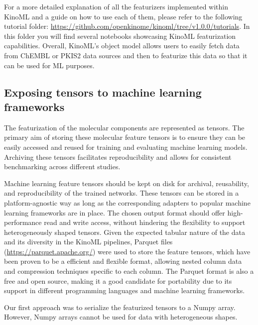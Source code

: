 \documentclass[9pt,lessons, pubversion]{livecoms}
\begin{document}
For a more detailed explanation of all the featurizers implemented within KinoML and a guide on how to use each of them, please refer to the following tutorial folder: \url{https://github.com/openkinome/kinoml/tree/v1.0.0/tutorials}. In this folder you will find several notebooks showcasing KinoML featurization capabilities. Overall, KinoML's object model allows users to easily fetch data from ChEMBL or PKIS2 data sources and then to featurize this data so that it can be used for ML purposes.


\subsection{Exposing tensors to machine learning frameworks}

The featurization of the molecular components are represented as tensors. The primary aim of storing these molecular feature tensors is to ensure they can be easily accessed and reused for training and evaluating machine learning models. Archiving these tensors facilitates reproducibility and allows for consistent benchmarking across different studies.

Machine learning feature tensors should be kept on disk for archival, reusability, and reproducibility of the trained networks. These tensors can be stored in a platform-agnostic way as long as the corresponding adapters to popular machine learning frameworks are in place.
The chosen output format should offer high-performance read and write access, without hindering the flexibility to support heterogeneously shaped tensors. 
Given the expected tabular nature of the data and its diversity in the KinoML pipelines, Parquet files (\url{https://parquet.apache.org/}) were used to store the feature tensors, which have been proven to be a efficient and flexible format, allowing nested column data and compression techniques specific to each column. The Parquet format is also a free and open source, making it a good candidate for portability due to its support in different programming languages and machine learning frameworks.


Our first approach was to serialize the featurized tensors to a Numpy array. However, Numpy arrays cannot be used for data with heterogeneous shapes. 


\end{document}

